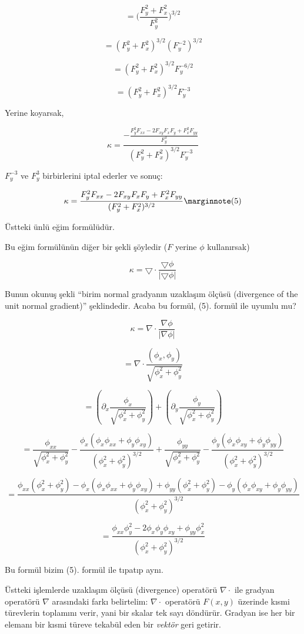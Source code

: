 \documentclass[12pt,fleqn]{article}\usepackage{../../common}
\begin{document}
$$ = \bigg( \frac{F_y^2 + F_x^2}{F_y^2} \bigg)^{3/2}  $$

$$ = (F_y^2 + F_x^2)^{3/2}(F_y^{-2})^{3/2}  $$

$$ = (F_y^2 + F_x^2)^{3/2}F_y^{-6/2}  $$

$$ = (F_y^2 + F_x^2)^{3/2}F_y^{-3} $$

Yerine koyarsak,

$$ 
\kappa = \frac{\displaystyle
- \frac{F_y^2F_{xx} - 2F_{xy}F_xF_y + F_x^2F_{yy}}{F_y^3}}
{(F_y^2 + F_x^2)^{3/2}F_y^{-3}}
 $$

$F_y^{-3}$ ve $F_y^{3}$ birbirlerini iptal ederler ve sonuç:

$$
\kappa = \frac{F_y^2F_{xx} - 2F_{xy}F_xF_y +
    F_x^2F_{yy}}{(F_y^2 + F_x^2)^{3/2}}
\mlabel{5}
$$

Üstteki ünlü eğim  formülüdür. 

Bu eğim formülünün diğer bir şekli şöyledir ($F$ yerine $\phi$ kullanırsak)

$$ \kappa = \bigtriangledown \cdot \frac{\bigtriangledown \phi}{|\bigtriangledown \phi|} $$

Bunun okunuş şekli ``birim normal gradyanın uzaklaşım ölçüsü (divergence of the
unit normal gradient)'' şeklindedir. Acaba bu formül, (5). formül ile
uyumlu mu?

$$ \kappa = \nabla \cdot \frac{\nabla \phi}{|\nabla \phi|}  $$

$$ = \nabla \cdot \frac{(\phi_x,\phi_y)}{\sqrt{\phi_x^2+\phi_y^2}} $$

$$ = \left(\partial_x \frac{\phi_x}{\sqrt{\phi_x^2+\phi_y^2}}\right)+ 
\left(\partial_y \frac{\phi_y}{\sqrt{\phi_x^2+\phi_y^2}}\right)  $$

$$ = \frac{\phi_{xx}}{\sqrt{\phi_x^2+\phi_y^2}} - \frac{\phi_x (\phi_x\phi_{xx}+\phi_y\phi_{xy})}
{(\phi_x^2+\phi_y^2)^{3/2}} +
\frac{\phi_{yy}}{\sqrt{\phi_x^2+\phi_y^2}} - \frac{\phi_y(\phi_x\phi_{xy}+\phi_y\phi_{yy})}
{(\phi_x^2+\phi_y^2)^{3/2}}  $$

$$ = \frac{\phi_{xx}(\phi_x^2+\phi_y^2) - \phi_x
  (\phi_x\phi_{xx}+\phi_y\phi_{xy}) +\phi_{yy}(\phi_x^2+\phi_y^2) -
  \phi_y(\phi_x\phi_{xy}+\phi_y\phi_{yy})}{(\phi_x^2+\phi_y^2)^{3/2}} $$

$$ = \frac{\phi_{xx}\phi_y^2 - 2\phi_x\phi_y\phi_{xy} + \phi_{yy}\phi_x^2}{(\phi_x^2+\phi_y^2)^{3/2}}  $$

Bu formül bizim (5). formül ile tıpatıp aynı.

Üstteki işlemlerde uzaklaşım ölçüsü (divergence) operatörü $\nabla \cdot$
ile gradyan operatörü $\nabla$ arasındaki farkı belirtelim: $\nabla \cdot$
operatörü $F(x,y)$ üzerinde kısmi türevlerin toplamını verir, yani bir
skalar tek sayı döndürür. Gradyan ise her bir elemanı bir kısmi türeve
tekabül eden bir {\em vektör} geri getirir.
\end{document}
